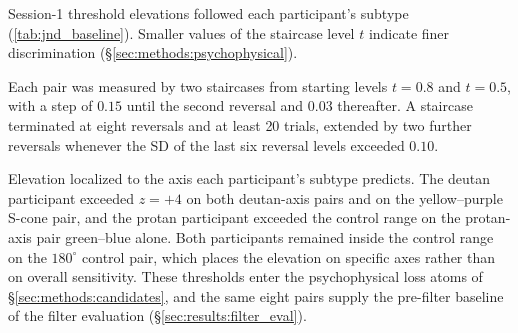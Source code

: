 
\renewcommand{\thetable}{S\arabic{table}}\setcounter{table}{0}




Session-1 threshold elevations followed each participant's subtype (\cref{tab:jnd_baseline}). Smaller values of the staircase level $t$ indicate finer discrimination (\S\ref{sec:methods:psychophysical}).

Each pair was measured by two staircases from starting levels $t = 0.8$ and $t = 0.5$, with a step of $0.15$ until the second reversal and $0.03$ thereafter. A staircase terminated at eight reversals and at least 20 trials, extended by two further reversals whenever the SD of the last six reversal levels exceeded $0.10$.

Elevation localized to the axis each participant's subtype predicts. The deutan participant exceeded $z = +4$ on both deutan-axis pairs and on the yellow--purple S-cone pair, and the protan participant exceeded the control range on the protan-axis pair green--blue alone. Both participants remained inside the control range on the $180^\circ$ control pair, which places the elevation on specific axes rather than on overall sensitivity. These thresholds enter the psychophysical loss atoms of \S\ref{sec:methods:candidates}, and the same eight pairs supply the pre-filter baseline of the filter evaluation (\S\ref{sec:results:filter_eval}).

